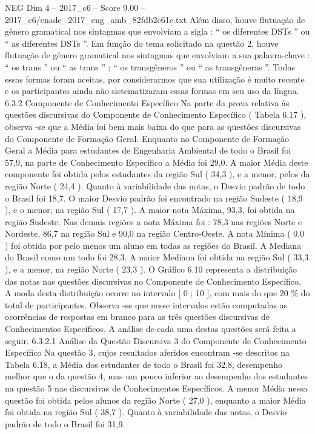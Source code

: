 \begin{textsample}{NEG Dim 4 – 2017\_c6 – Score 9.00 – 2017\_c6/enade\_2017\_eng\_amb\_82fdb2c61c.txt}
Além disso, houve flutuação de gênero gramatical nos sintagmas que envolviam a sigla : “ os diferentes DSTs ” ou “ as diferentes DSTs ”.
Em função do tema solicitado na questão 2, houve flutuação de gênero gramatical nos sintagmas que envolviam a sua palavra-chave : “ os trans ” ou “ as trans ” ; “ os transgêneros ” ou “ as transgêneras ”.
Todas essas formas foram aceitas, por considerarmos que sua utilização é muito recente e os participantes ainda não sistematizaram essas formas em seu uso da língua. 6.3.2 Componente de Conhecimento Específico Na parte da prova relativa às questões discursivas do Componente de Conhecimento Específico ( Tabela 6.17 ), observa -se que a Média foi bem mais baixa do que para as questões discursivas do Componente de Formação Geral.
Enquanto no Componente de Formação Geral a Média para estudantes de Engenharia Ambiental de todo o Brasil foi 57,9, na parte de Conhecimento Específico a Média foi 29,0.
A maior Média deste componente foi obtida pelos estudantes da região Sul ( 34,3 ), e a menor, pelos da região Norte ( 24,4 ).
Quanto à variabilidade das notas, o Desvio padrão de todo o Brasil foi 18,7.
O maior Desvio padrão foi encontrado na região Sudeste ( 18,9 ), e o menor, na região Sul ( 17,7 ).
A maior nota Máxima, 93,3, foi obtida na região Sudeste.
Nas demais regiões a nota Máxima foi : 78,3 nas regiões Norte e Nordeste, 86,7 na região Sul e 90,0 na região Centro-Oeste.
A nota Mínima ( 0,0 ) foi obtida por pelo menos um aluno em todas as regiões do Brasil.
A Mediana do Brasil como um todo foi 28,3.
A maior Mediana foi obtida na região Sul ( 33,3 ), e a menor, na região Norte ( 23,3 ).
O Gráfico 6.10 representa a distribuição das notas nas questões discursivas no Componente de Conhecimento Específico.
A moda desta distribuição ocorre no intervalo [ 0 ; 10 ], com mais do que 20 \% do total de participantes.
Observa -se que nesse intervalos estão computadas as ocorrências de respostas em branco para as três questões discursivas de Conhecimentos Específicos.
A análise de cada uma destas questões será feita a seguir. 6.3.2.1 Análise da Questão Discursiva 3 do Componente de Conhecimento Específico Na questão 3, cujos resultados aferidos encontram -se descritos na Tabela 6.18, a Média dos estudantes de todo o Brasil foi 32,8, desempenho melhor que o da questão 4, mas um pouco inferior ao desempenho dos estudantes na questão 5 nas discursivas de Conhecimentos Específicos.
A menor Média nessa questão foi obtida pelos alunos da região Norte ( 27,0 ), enquanto a maior Média foi obtida na região Sul ( 38,7 ).
Quanto à variabilidade das notas, o Desvio padrão de todo o Brasil foi 31,9.

\end{textsample}
